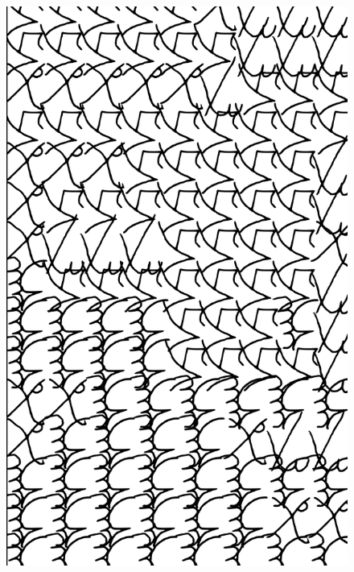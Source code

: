 \makeatletter\@openrightfalse
\movetooddpage
\begin{absolutelynopagebreak}
\begin{vplace}
\begin{figure}[H]
\begin{adjustwidth}{-0.99cm}{}
  \centering
  \vspace*{-1.97cm}
  \hspace*{-0.65cm}
  \includegraphics[width=115mm]{./imgs/img12.pdf}  
  \hfill
\end{adjustwidth}

\thispagestyle{empty}

\end{figure}
\end{vplace}

\end{absolutelynopagebreak}

